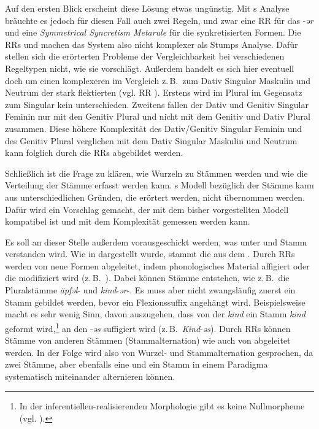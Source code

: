 \begin{exe}
\begin{exe}
Auf den ersten Blick erscheint diese Lösung etwas ungünstig. Mit \citeauthor{Stump2001}s \citeyearpar{Stump2001} Analyse bräuchte es jedoch für diesen Fall auch zwei Regeln, und zwar eine RR für das  -\textit{ər} und eine \textit{Symmetrical Syncretism Metarule} für die synkretisierten Formen. Die RRs  und  machen das System also nicht komplexer als Stumps Analyse. Dafür stellen sich die erörterten Probleme der Vergleichbarkeit bei verschiedenen Regeltypen nicht, wie sie \citet{Stump2001} vorschlägt. Außerdem handelt es sich hier eventuell doch um einen komplexeren  im Vergleich z.\,B.\ zum Dativ Singular Maskulin und Neutrum der stark flektierten  (vgl. RR ). Erstens wird im Plural im Gegensatz zum Singular kein  unterschieden. Zweitens fallen der Dativ und Genitiv Singular Feminin nur mit den Genitiv Plural und nicht mit dem Genitiv und Dativ Plural zusammen. Diese höhere Komplexität des Dativ/Genitiv Singular Feminin und des Genitiv Plural verglichen mit dem Dativ Singular Maskulin und Neutrum kann folglich durch die RRs abgebildet werden.

 Schließlich ist die Frage zu klären, wie Wurzeln zu Stämmen werden und wie die Verteilung der Stämme erfasst werden kann. \citeauthor{Stump2001}s \citeyearpar{Stump2001} Modell bezüglich der Stämme kann aus unterschiedlichen Gründen, die erörtert werden, nicht übernommen werden. Dafür wird ein Vorschlag gemacht, der mit dem bisher vorgestellten Modell kompatibel ist und mit dem Komplexität gemessen werden kann.

Es soll an dieser Stelle außerdem vorausgeschickt werden, was unter  und Stamm verstanden wird. Wie in  dargestellt wurde, stammt die  aus dem . Durch RRs werden von  neue Formen abgeleitet, indem phonologisches Material affigiert oder die  modifiziert wird (z.\,B.\ ). Dabei können Stämme entstehen, wie z.\,B.\ die Pluralstämme \textit{äpfəl}- und \textit{kind}-\textit{ər}-. Es muss aber nicht zwangsläufig zuerst ein Stamm gebildet werden, bevor ein Flexionssuffix angehängt wird. Beispielsweise macht es sehr wenig Sinn, davon auszugehen, dass von der  \textit{kind} ein Stamm \textit{kind} geformt wird,\footnote{In der in\-fe\-ren\-tiel\-len-re\-a\-li\-sie\-ren\-den Morphologie gibt es keine Nullmorpheme (vgl. ).} an den -\textit{əs} suffigiert wird (z.\,B.\ \textit{Kind}-\textit{əs}). Durch RRs können Stämme von anderen Stämmen (Stammalternation) wie auch von  abgeleitet werden. In der Folge wird also von Wurzel- und Stammalternation gesprochen, da zwei Stämme, aber ebenfalls eine  und ein Stamm in einem Paradigma systematisch miteinander alternieren können.\\


\end{exe}
\end{exe}
